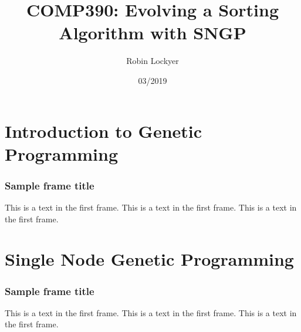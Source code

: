 \documentclass{beamer}
\title{COMP390: Evolving a Sorting Algorithm with SNGP}
\author{Robin Lockyer}
\institute{University of Liverpool}
\date{03/2019}
\begin{document}
	
	\frame{\titlepage}
	
	\frame{\tableofcontents}
	
	\section{Introduction to Genetic Programming}
	
		\begin{frame}
			\frametitle{Sample frame title}
			This is a text in the first frame. This is a text in the first frame. This is a text in the first frame.
		\end{frame}
	
	\section{Single Node Genetic Programming}
	
		\begin{frame}
			\frametitle{Sample frame title}
			This is a text in the first frame. This is a text in the first frame. This is a text in the first frame.
		\end{frame}
		
\end{document}
